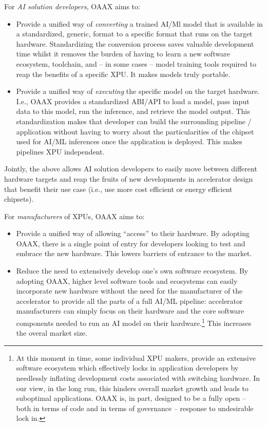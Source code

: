 \documentclass{article}
\begin{document}
For \emph{AI solution developers}, OAAX aims to:
\begin{itemize}
\item Provide a unified way of \emph{converting} a trained AI/Ml model that is available in a standardized, generic, format to a specific format that runs on the target hardware. Standardizing the conversion process saves valuable development time whilst it removes the burden of having to learn a new software ecosystem, toolchain, and -- in some cases -- model training tools required to reap the benefits of a specific XPU. It makes models truly portable.
\item Provide a unified way of \emph{executing} the specific model on the target hardware. I.e., OAAX provides a standardized ABI/API to load a model, pass input data to this model, run the inference, and retrieve the model output. This standardization makes that developer can build the surrounding pipeline / application without having to worry about the particularities of the chipset used for AI/ML inferences once the application is deployed. This makes pipelines XPU independent.
\end{itemize}

Jointly, the above allows AI solution developers to easily move between different hardware targets and reap the fruits of new developments in accelerator design that benefit their use case (i.e., use more cost efficient or energy efficient chipsets).

For \emph{manufacturers} of XPUs, OAAX aims to:
\begin{itemize}
\item Provide a unified way of allowing ``access'' to their hardware. By adopting OAAX, there is a single point of entry for developers looking to test and embrace the new hardware. This lowers barriers of entrance to the market.
\item Reduce the need to extensively develop one's own software ecosystem. By adopting OAAX, higher level software tools and ecosystems can easily incorporate new hardware without the need for the manufacturer of the accelerator to provide all the parts of a full AI/ML pipeline: accelerator manufacturers can simply focus on their hardware and the core software components needed to run an AI model on their hardware.\footnote{At this moment in time, some individual XPU makers, provide an extensive software ecosystem which effectively locks in application developers by needlessly inflating development costs associated with switching hardware. In our view, in the long run, this hinders overall market growth and leads to suboptimal applications. OAAX is, in part, designed to be a fully open -- both in terms of code and in terms of governance -- response to undesirable lock in.} This increases the overal market size.
\end{itemize}
\end{document}
